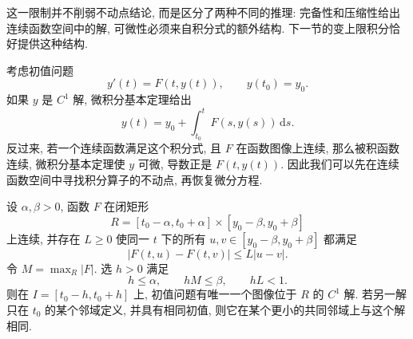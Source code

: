 这一限制并不削弱不动点结论, 而是区分了两种不同的推理: 完备性和压缩性给出连续函数空间中的解, 可微性必须来自积分式的额外结构. 下一节的变上限积分恰好提供这种结构.


考虑初值问题
\[
y'(t)=F(t,y(t)),\qquad y(t_0)=y_0.
\]
如果 $y$ 是 $C^1$ 解, 微积分基本定理给出
\[
y(t)=y_0+\int_{t_0}^{t}F(s,y(s))\,\mathrm ds.
\]
反过来, 若一个连续函数满足这个积分式, 且 $F$ 在函数图像上连续, 那么被积函数连续, 微积分基本定理使 $y$ 可微, 导数正是 $F(t,y(t))$. 因此我们可以先在连续函数空间中寻找积分算子的不动点, 再恢复微分方程.

\begin{theorem}\label{thm:picard-local}
设 $\alpha,\beta>0$, 函数 $F$ 在闭矩形
\[
R=[t_0-\alpha,t_0+\alpha]\times[y_0-\beta,y_0+\beta]
\]
上连续, 并存在 $L\geq0$ 使同一 $t$ 下的所有 $u,v\in[y_0-\beta,y_0+\beta]$ 都满足
\[
|F(t,u)-F(t,v)|\leq L|u-v|.
\]
令 $M=\max_R|F|$. 选 $h>0$ 满足
\[
h\leq\alpha,\qquad hM\leq\beta,\qquad hL<1.
\]
则在 $I=[t_0-h,t_0+h]$ 上, 初值问题有唯一一个图像位于 $R$ 的 $C^1$ 解. 若另一解只在 $t_0$ 的某个邻域定义, 并具有相同初值, 则它在某个更小的共同邻域上与这个解相同.
\end{theorem}
